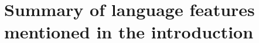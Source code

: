 \documentclass{article}
\begin{document}
\section*{Summary of language features mentioned in the introduction}
\label{sec:summ-lang-feat}

\end{document}

